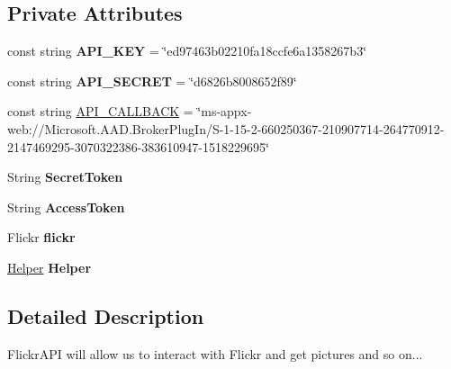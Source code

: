 \subsection*{Private Attributes}
\begin{DoxyCompactItemize}
\item 
\mbox{\label{classepicture_1_1_flickr_api_a6f1e1718b8dc79e8857f9ea71879fb75}} 
const string {\bfseries A\+P\+I\+\_\+\+K\+EY} = \char`\"{}ed97463b02210fa18ccfe6a1358267b3\char`\"{}
\item 
\mbox{\label{classepicture_1_1_flickr_api_a88b3b145ac8b7cfb264b992c215ccfde}} 
const string {\bfseries A\+P\+I\+\_\+\+S\+E\+C\+R\+ET} = \char`\"{}d6826b8008652f89\char`\"{}
\item 
const string \mbox{\hyperlink{classepicture_1_1_flickr_api_aa2d58a7bd6de20766896ad0b717100bb}{A\+P\+I\+\_\+\+C\+A\+L\+L\+B\+A\+CK}} = \char`\"{}ms-\/appx-\/web\+://Microsoft.\+A\+A\+D.\+Broker\+Plug\+In/S-\/1-\/15-\/2-\/660250367-\/210907714-\/264770912-\/2147469295-\/3070322386-\/383610947-\/1518229695\char`\"{}
\item 
\mbox{\label{classepicture_1_1_flickr_api_a278659143c782dc0f3d0cd5af4f44513}} 
String {\bfseries Secret\+Token}
\item 
\mbox{\label{classepicture_1_1_flickr_api_a0ca06cbf2214c4ba041803f7eafa3317}} 
String {\bfseries Access\+Token}
\item 
\mbox{\label{classepicture_1_1_flickr_api_a241660e21ea428b33ff3c6157eeb3ed9}} 
Flickr {\bfseries flickr}
\item 
\mbox{\label{classepicture_1_1_flickr_api_a2ab99ed8b12c50cd07de3bec64eadc74}} 
\mbox{\hyperlink{classepicture_1_1_helper}{Helper}} {\bfseries Helper}
\end{DoxyCompactItemize}


\subsection{Detailed Description}
Flickr\+A\+PI will allow us to interact with Flickr and get pictures and so on... 

